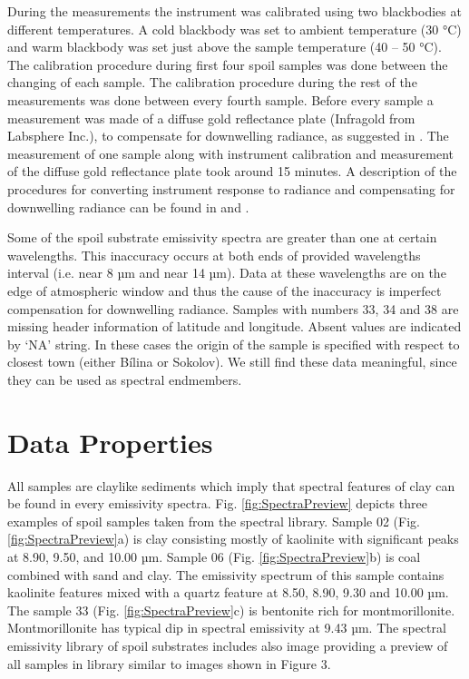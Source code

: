 During the measurements the instrument was calibrated using two blackbodies at different temperatures. A cold blackbody was set to ambient temperature (30 °C) and warm blackbody was set just above the sample temperature (40 – 50 °C). The calibration procedure during first four spoil samples was done between the changing of each sample. The calibration procedure during the rest of the measurements was done between every fourth sample. Before every sample a measurement was made of a diffuse gold reflectance plate (Infragold from Labsphere Inc.), to compensate for downwelling radiance, as suggested in \cite{GV13}. The measurement of one sample along with instrument calibration and measurement of the diffuse gold reflectance plate took around 15 minutes. A description of the procedures for converting instrument response to radiance and compensating for downwelling radiance can be found in \cite{HJ98} and \cite{HK96}.

Some of the spoil substrate emissivity spectra are greater than one at certain wavelengths. This inaccuracy occurs at both ends of provided wavelengths interval (i.e. near 8 µm and near 14 µm). Data at these wavelengths are on the edge of atmospheric window and thus the cause of the inaccuracy is imperfect compensation for downwelling radiance. Samples with numbers 33, 34 and 38 are missing header information of latitude and longitude. Absent values are indicated by ‘NA’ string. In these cases the origin of the sample is specified with respect to closest town (either Bílina or Sokolov). We still find these data meaningful, since they can be used as spectral endmembers.


\section{Data Properties}

All samples are claylike sediments which imply that spectral features of clay can be found in every emissivity spectra. Fig. \ref{fig:SpectraPreview} depicts three examples of spoil samples taken from the spectral library. Sample 02 (Fig. \ref{fig:SpectraPreview}a) is clay consisting mostly of kaolinite with significant peaks at 8.90, 9.50, and 10.00 µm. Sample 06 (Fig. \ref{fig:SpectraPreview}b) is coal combined with sand and clay. The emissivity spectrum of this sample contains kaolinite features mixed with a quartz feature at 8.50, 8.90, 9.30 and 10.00 µm. The sample 33 (Fig. \ref{fig:SpectraPreview}c) is bentonite rich for montmorillonite. Montmorillonite has typical dip in spectral emissivity at 9.43 µm. The spectral emissivity library of spoil substrates includes also image providing a preview of all samples in library similar to images shown in Figure 3.

